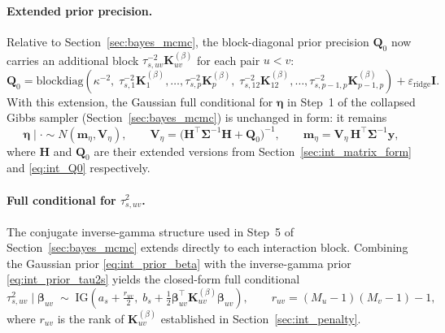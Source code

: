 \paragraph{Extended prior precision.}
Relative to Section~\ref{sec:bayes_mcmc}, the block-diagonal prior precision $\mathbf Q_0$
now carries an additional block $\tau^{-2}_{s,uv}\mathbf K_{uv}^{(\beta)}$ for each pair
$u<v$:
\begin{equation}
\mathbf Q_0=\mathrm{blockdiag}\!\left(
\kappa^{-2},\;
\tau^{-2}_{s,1}\mathbf K_1^{(\beta)},\ldots,
\tau^{-2}_{s,p}\mathbf K_p^{(\beta)},\;
\tau^{-2}_{s,12}\mathbf K_{12}^{(\beta)},\ldots,
\tau^{-2}_{s,p-1,p}\mathbf K_{p-1,p}^{(\beta)}
\right)+\varepsilon_{\mathrm{ridge}}\mathbf I.
\label{eq:int_Q0}
\end{equation}
With this extension, the Gaussian full conditional for $\boldsymbol\eta$ in Step~1 of the
collapsed Gibbs sampler (Section~\ref{sec:bayes_mcmc}) is unchanged in form: it remains
\[
\boldsymbol\eta\mid\cdot\sim N(\boldsymbol m_\eta,\mathbf V_\eta),
\qquad
\mathbf V_\eta=\big(\mathbf H^\top\boldsymbol\Sigma^{-1}\mathbf H+\mathbf Q_0\big)^{-1},
\qquad
\boldsymbol m_\eta=\mathbf V_\eta\,\mathbf H^\top\boldsymbol\Sigma^{-1}\boldsymbol y,
\]
where $\mathbf H$ and $\mathbf Q_0$ are their extended versions from
Section~\ref{sec:int_matrix_form} and \eqref{eq:int_Q0} respectively.

\paragraph{Full conditional for $\tau^2_{s,uv}$.}
The conjugate inverse-gamma structure used in Step~5 of Section~\ref{sec:bayes_mcmc}
extends directly to each interaction block. Combining the Gaussian prior
\eqref{eq:int_prior_beta} with the inverse-gamma prior \eqref{eq:int_prior_tau2s} yields the
closed-form full conditional
\begin{equation}
\tau^2_{s,uv}\mid\boldsymbol\beta_{uv}
\;\sim\;
\mathrm{IG}\!\left(a_s+\tfrac{r_{uv}}{2},\;b_s+\tfrac{1}{2}\boldsymbol\beta_{uv}^\top
\mathbf K_{uv}^{(\beta)}\boldsymbol\beta_{uv}\right),
\qquad
r_{uv}=(M_u-1)(M_v-1)-1,
\label{eq:int_fc_tau2s}
\end{equation}
where $r_{uv}$ is the rank of $\mathbf K_{uv}^{(\beta)}$ established in
Section~\ref{sec:int_penalty}.

